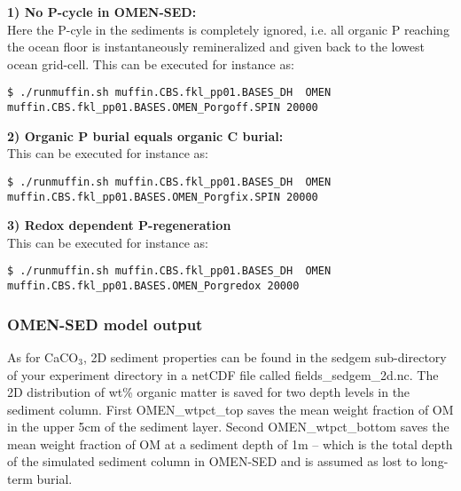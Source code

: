 \documentclass[11pt,fleqn]{book} %
\begin{document}
\vspace{1mm}
\noindent
\textbf{1) No P-cycle in OMEN-SED:}\\
Here the P-cyle in the sediments is completely ignored, i.e. all organic P reaching the ocean floor is instantaneously remineralized and given back to the lowest ocean grid-cell. This can be executed for instance as:
\vspace{-1mm}
\begin{verbatim}
$ ./runmuffin.sh muffin.CBS.fkl_pp01.BASES_DH  OMEN
muffin.CBS.fkl_pp01.BASES.OMEN_Porgoff.SPIN 20000
\end{verbatim}
\vspace{-1mm}

\vspace{1mm}
\noindent
\textbf{2) Organic P burial equals organic C burial:}\\
This can be executed for instance as:
\vspace{-1mm}
\begin{verbatim}
$ ./runmuffin.sh muffin.CBS.fkl_pp01.BASES_DH  OMEN
muffin.CBS.fkl_pp01.BASES.OMEN_Porgfix.SPIN 20000
\end{verbatim}
\vspace{-1mm}

\vspace{1mm}
\noindent
\textbf{3) Redox dependent P-regeneration}\\
This can be executed for instance as:
\vspace{-1mm}
\begin{verbatim}
$ ./runmuffin.sh muffin.CBS.fkl_pp01.BASES_DH  OMEN
muffin.CBS.fkl_pp01.BASES.OMEN_Porgredox 20000
\end{verbatim}
\vspace{-1mm}

%
\subsubsection*{OMEN-SED model output}
As for CaCO$_3$, 2D sediment properties can be found in  the \textsf{\footnotesize sedgem } sub-directory of your experiment directory  in a netCDF file called \textsf{\footnotesize fields\_sedgem\_2d.nc}.
The 2D distribution of wt\% organic matter is saved for two depth levels in the sediment column. First \textsf{\footnotesize OMEN\_wtpct\_top} saves the mean weight fraction of OM in the upper 5cm of the sediment layer.
Second \textsf{\footnotesize OMEN\_wtpct\_bottom} saves the mean weight fraction of OM at a sediment depth of 1m -- which is the total depth of the simulated sediment column in OMEN-SED and is assumed as lost to long-term burial.
\end{document}
